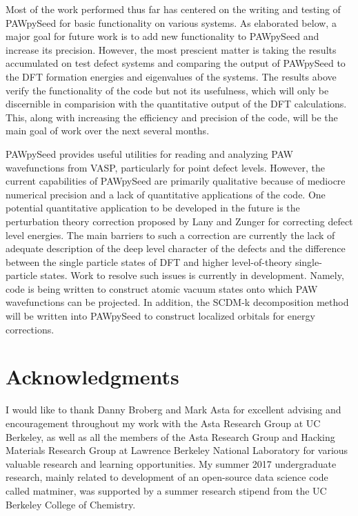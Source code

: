 \documentclass[12pt]{article}
\begin{document}
Most of the work performed thus far has centered on the writing and testing of
PAWpySeed for basic functionality on various systems. As elaborated below,
a major goal for future work is to add new functionality to PAWpySeed and increase
its precision. However, the most prescient matter is taking the results
accumulated on test defect systems and comparing the output of PAWpySeed to the
DFT formation energies and eigenvalues of the systems. The results above
verify the functionality of the code but not its usefulness, which will only
be discernible in comparision with the quantitative output of the DFT calculations.
This, along with increasing the efficiency and precision of the code, will be
the main goal of work over the next several months.

PAWpySeed provides useful utilities for reading and analyzing PAW wavefunctions
from VASP, particularly for point defect levels. However, the current capabilities
of PAWpySeed are primarily qualitative because of mediocre numerical precision
and a lack of quantitative applications of the code. One potential quantitative
application to be developed in the future is the perturbation theory correction
proposed by Lany and Zunger for correcting defect level energies.\cite{lany}
The main barriers to such a correction are currently the lack of adequate
description of the deep level character of the defects and the difference
between the single particle states of DFT and higher level-of-theory
single-particle states. Work to resolve such issues is currently in development.
Namely, code is being written to construct atomic vacuum states onto which
PAW wavefunctions can be projected. In addition, the SCDM-k decomposition method
will be written into PAWpySeed to construct localized orbitals for energy
corrections.\cite{scdm,scdmk}

\section{Acknowledgments}

I would like to thank Danny Broberg and Mark Asta for excellent advising
and encouragement throughout my work with the Asta Research Group at UC Berkeley,
as well as all the members of the Asta Research Group and Hacking Materials
Research Group at Lawrence Berkeley National Laboratory for various
valuable research and learning opportunities. My summer 2017 undergraduate
research, mainly related to development of an open-source data science code
called matminer, was supported
by a summer research stipend from the UC Berkeley College of Chemistry.
\end{document}
